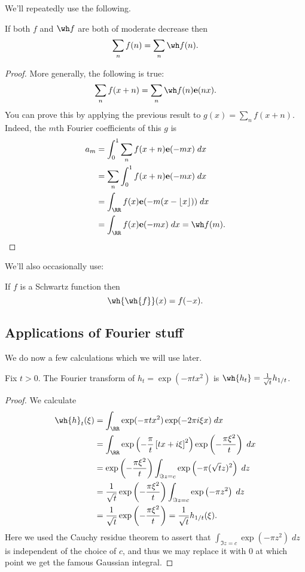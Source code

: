 We'll repeatedly use the following.
\begin{theorem}
  If both $f$ and $\wh f$ are both of
  moderate decrease then
  \[ \sum_n f(n) = \sum_n \wh f(n). \]
\end{theorem}
\begin{proof}
  More generally, the following is true:
  \[ \sum_n f(x+n) = \sum_n \wh f(n) \ee(nx). \]
  You can prove this by applying
  the previous result to $g(x) = \sum_n f(x+n)$.
  Indeed, the $m$th Fourier coefficients of this $g$ is
  \begin{align*}
    a_m &= \int_0^1 \sum_n f(x+n) \ee(-mx) \; dx \\
    &= \sum_n \int_0^1 f(x+n) \ee(-mx) \; dx \\
    &= \int_\RR f(x) \ee(-m(x-\left\lfloor x \right\rfloor)) \; dx \\
    &= \int_\RR f(x) \ee(-mx) \; dx = \wh f(m).
    \qedhere
  \end{align*}
\end{proof}

We'll also occasionally use:
\begin{theorem}
  If $f$ is a Schwartz function then
  \[ \wh{\wh{f}}(x) = f(-x). \]
\end{theorem}

\subsection{Applications of Fourier stuff}
We do now a few calculations which we will use later.

\begin{proposition}
  Fix $t > 0$.
  The Fourier transform of $h_t = \exp(-\pi t x^2)$
  is $\wh{h_t} = \frac{1}{\sqrt{t}} h_{1/t}$.
\end{proposition}
\begin{proof}
  We calculate
  \begin{align*}
    \wh{h}_t(\xi)
    &= \int_\RR \exp(-\pi t x^2) \exp(-2\pi i \xi x) \; dx \\
    &= \int_\RR \exp \left( -\frac{\pi}{t}
      \left[ t x + i \xi \right]^2 \right)
      \exp\left( -\frac{\pi \xi^2}{t} \right) \; dx \\
    &= \exp\left( -\frac{\pi \xi^2}{t} \right)
      \int_{\Im z = c} \exp \left( - \pi (\sqrt t z)^2 \right) \; dz \\
    &= \frac{1}{\sqrt{t}}
      \exp\left( -\frac{\pi \xi^2}{t} \right)
      \int_{\Im z = c} \exp \left( - \pi z^2 \right) \; dz \\
    &= \frac{1}{\sqrt{t}}
      \exp\left( -\frac{\pi \xi^2}{t} \right)
    = \frac{1}{\sqrt{t}} h_{1/t}(\xi).
  \end{align*}
  Here we used the Cauchy residue theorem
  to assert that
  $\int_{\Im z = c} \exp \left( - \pi z^2 \right) \; dz$
  is independent of the choice of $c$,
  and thus we may replace it with $0$
  at which point we get the famous Gaussian integral.
\end{proof}

